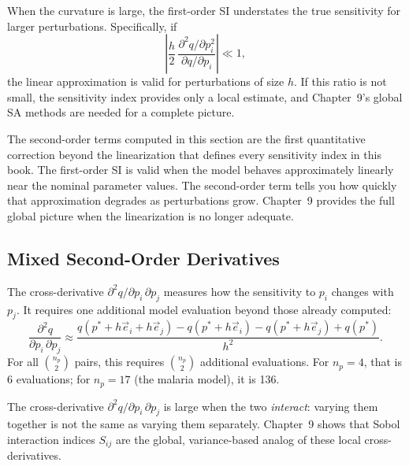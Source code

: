 When the curvature is large, the first-order SI understates the
true sensitivity for larger perturbations.
Specifically, if
\[
  \left|\frac{h}{2}\,\frac{\partial^2 q/\partial p_i^2}
                   {\partial q/\partial p_i}\right| \ll 1,
\]
the linear approximation is valid for perturbations of size $h$.
If this ratio is not small, the sensitivity index provides only
a local estimate, and Chapter~9's global SA methods are needed
for a complete picture.

 The second-order terms computed in this section
are the first quantitative correction beyond the linearization
that defines every sensitivity index in this book.
The first-order SI is valid when the model behaves approximately
linearly near the nominal parameter values.
The second-order term tells you how quickly that approximation
degrades as perturbations grow. Chapter~9 provides the full
global picture when the linearization is no longer adequate.

\subsection{Mixed Second-Order Derivatives}

The cross-derivative $\partial^2 q/\partial p_i\,\partial p_j$
measures how the sensitivity to $p_i$ changes with $p_j$.
It requires one additional model evaluation beyond those already computed:
\begin{equation}
  \frac{\partial^2 q}{\partial p_i\,\partial p_j}
  \approx \frac{q(p^*+h\vec{e}_i+h\vec{e}_j)
              - q(p^*+h\vec{e}_i)
              - q(p^*+h\vec{e}_j)
              + q(p^*)}{h^2}.
  \label{eq:second_mixed}
\end{equation}
For all $\binom{n_p}{2}$ pairs, this requires $\binom{n_p}{2}$
additional evaluations.
For $n_p = 4$, that is 6 evaluations; for $n_p = 17$
(the malaria model), it is 136.

The cross-derivative $\partial^2 q/\partial p_i\,\partial p_j$
is large when the two \POIs \emph{interact}: varying them together
is not the same as varying them separately.
Chapter~9 shows that Sobol interaction indices $S_{ij}$ are the
global, variance-based analog of these local cross-derivatives.

